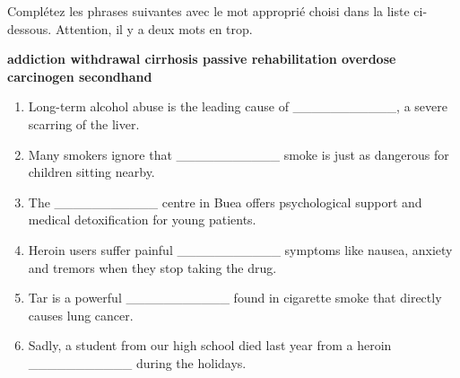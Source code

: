 \documentclass[11pt]{article}
\begin{document}
\begin{exercice}
Complétez les phrases suivantes avec le mot approprié choisi dans la liste ci-dessous. Attention, il y a deux mots en trop.
\begin{center}
\textbf{addiction \quad withdrawal \quad cirrhosis \quad passive \quad rehabilitation \quad overdose \quad carcinogen \quad secondhand}
\end{center}
\begin{enumerate}
    \item Long-term alcohol abuse is the leading cause of \_\_\_\_\_\_\_\_\_\_\_, a severe scarring of the liver.
    \item Many smokers ignore that \_\_\_\_\_\_\_\_\_\_\_ smoke is just as dangerous for children sitting nearby.
    \item The \_\_\_\_\_\_\_\_\_\_\_ centre in Buea offers psychological support and medical detoxification for young patients.
    \item Heroin users suffer painful \_\_\_\_\_\_\_\_\_\_\_ symptoms like nausea, anxiety and tremors when they stop taking the drug.
    \item Tar is a powerful \_\_\_\_\_\_\_\_\_\_\_ found in cigarette smoke that directly causes lung cancer.
    \item Sadly, a student from our high school died last year from a heroin \_\_\_\_\_\_\_\_\_\_\_ during the holidays.
\end{enumerate}
\end{exercice}
\end{document}
